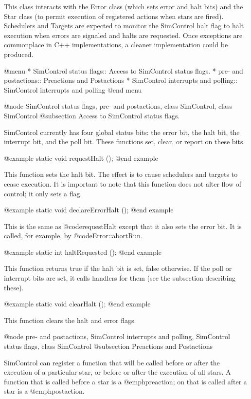 This class interacts with the Error class (which sets error and halt
bits) and the Star class (to permit execution of registered actions when
stars are fired).  Schedulers and Targets are expected to monitor
the SimControl halt flag to halt execution when errors are signaled
and halts are requested.  Once exceptions are commonplace in C++
implementations, a cleaner implementation could be produced.

@menu
* SimControl status flags::     Access to SimControl status flags.
* pre- and postactions::        Preactions and Postactions
* SimControl interrupts and polling::  SimControl interrupts and polling
@end menu

@node SimControl status flags, pre- and postactions, class SimControl, class SimControl
@subsection Access to SimControl status flags.

SimControl currently has four global status bits: the error bit,
the halt bit, the interrupt bit, and the poll bit.  These functions
set, clear, or report on these bits.

@example
static void requestHalt ();
@end example

This function sets the halt bit.  The effect is to cause schedulers
and targets to cease execution.  It is important to note that this
function does not alter flow of control; it only sets a flag.

@example
static void declareErrorHalt ();
@end example

This is the same as @code{requestHalt} except that it also sets the
error bit.  It is called, for example, by @code{Error::abortRun}.

@example
static int haltRequested ();
@end example

This function returns true if the halt bit is set, false otherwise.
If the poll or interrupt bits are set, it calls handlers for them
(see the subsection describing these).

@example
static void clearHalt ();
@end example

This function clears the halt and error flags.

@node pre- and postactions, SimControl interrupts and polling, SimControl status flags, class SimControl
@subsection Preactions and Postactions

SimControl can register a function that will be called before
or after the execution of a particular star, or before or after
the execution of all stars.  A function that is called before
a star is a @emph{preaction}; on that is called after a star is
a @emph{postaction}.

